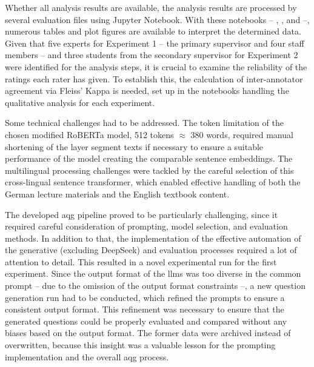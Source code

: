 Whether all analysis results are available, the analysis results are processed by several evaluation files using Jupyter Notebook. With these notebooks -- , , and  --, numerous tables and plot figures are available to interpret the determined data. Given that five experts for Experiment 1 -- the primary supervisor and four staff members -- and three students from the secondary supervisor for Experiment 2 were identified for the analysis steps, it is crucial to examine the reliability of the ratings each rater has given. To establish this, the calculation of inter-annotator agreement via Fleiss' Kappa \cite{fleiss_measuring_1971} is needed, set up in the notebooks handling the qualitative analysis for each experiment.

Some technical challenges had to be addressed. The token limitation of the chosen modified RoBERTa model, 512 tokens $\approx$ 380 words, required manual shortening of the layer segment texts if necessary to ensure a suitable performance of the model creating the comparable sentence embeddings. The multilingual processing challenges were tackled by the careful selection of this cross-lingual sentence transformer, which enabled effective handling of both the German lecture materials and the English textbook content.

\pagebreak

The developed \ac{aqg} pipeline proved to be particularly challenging, since it required careful consideration of prompting, model selection, and evaluation methods. In addition to that, the implementation of the effective automation of the generative (excluding DeepSeek) and evaluation processes required a lot of attention to detail. This resulted in a novel experimental run for the first experiment. Since the output format of the \acp{llm} was too diverse in the common prompt -- due to the omission of the output format constraints --, a new question generation run had to be conducted, which refined the prompts to ensure a consistent output format. This refinement was necessary to ensure that the generated questions could be properly evaluated and compared without any biases based on the output format. The former data were archived instead of overwritten, because this insight was a valuable lesson for the prompting implementation and the overall \ac{aqg} process.